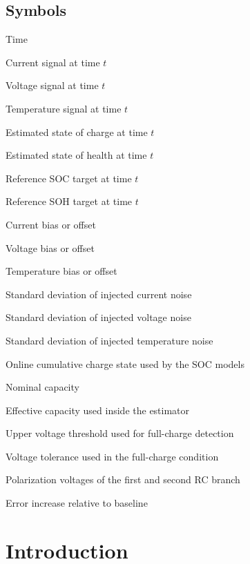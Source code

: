 \documentclass[review,nopreprintline]{elsarticle}
\begin{document}
\subsection*{Symbols}
\begin{description}[style=multiline,leftmargin=1.7cm,font=\bfseries]
\item[$t$] Time
\item[$I(t)$] Current signal at time $t$
\item[$U(t)$] Voltage signal at time $t$
\item[$T(t)$] Temperature signal at time $t$
\item[$\widehat{\mathrm{SOC}}(t)$] Estimated state of charge at time $t$
\item[$\widehat{\mathrm{SOH}}(t)$] Estimated state of health at time $t$
\item[$\mathrm{SOC}_{\mathrm{ref}}(t)$] Reference SOC target at time $t$
\item[$\mathrm{SOH}_{\mathrm{ref}}(t)$] Reference SOH target at time $t$
\item[$\Delta I$] Current bias or offset
\item[$\Delta U$] Voltage bias or offset
\item[$\Delta T$] Temperature bias or offset
\item[$\sigma_I$] Standard deviation of injected current noise
\item[$\sigma_U$] Standard deviation of injected voltage noise
\item[$\sigma_T$] Standard deviation of injected temperature noise
\item[$Q_c$] Online cumulative charge state used by the SOC models
\item[$C_{\mathrm{nom}}$] Nominal capacity
\item[$C_{\mathrm{eff}}$] Effective capacity used inside the estimator
\item[$U_{\max}$] Upper voltage threshold used for full-charge detection
\item[$U_{\mathrm{tol}}$] Voltage tolerance used in the full-charge condition
\item[$U_{1},U_{2}$] Polarization voltages of the first and second RC branch
\item[$\Delta\mathrm{MAE}$] Error increase relative to baseline
\end{description}
\normalsize

\section{Introduction}
\end{document}

